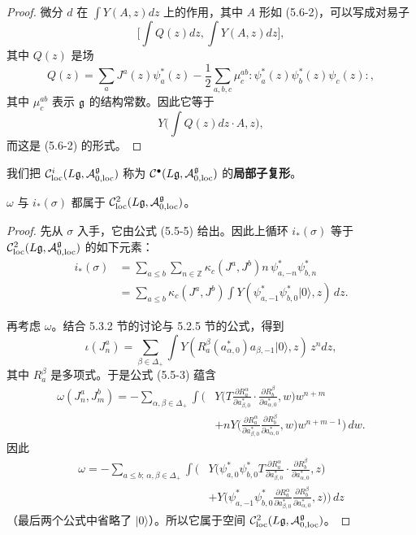 \begin{proof}
微分 $d$ 在 $\int Y(A,z)dz$ 上的作用，其中 $A$ 形如 (5.6-2)，可以写成对易子
\[
\Big[\int Q(z)dz,\int Y(A,z)dz\Big],
\]
其中 $Q(z)$ 是场
\begin{equation}
Q(z) = \sum_a J^a(z)\psi^*_a(z) - \frac{1}{2}\sum_{a,b,c}\mu^{ab}_c{:}\psi^*_a(z)\psi^*_b(z)\psi_c(z){:},
\tag{5.6-3}
\end{equation}
其中 $\mu^{ab}_c$ 表示 $\mathfrak{g}$ 的结构常数。因此它等于
\[
Y\Big(\int Q(z)dz\cdot A,z\Big),
\]
而这是 (5.6-2) 的形式。
\end{proof}

我们把 $\mathcal{C}^i_{\mathrm{loc}}(L\mathfrak{g},\mathcal{A}^{\mathfrak{g}}_{0,\mathrm{loc}})$ 称为 $\mathcal{C}^\bullet(L\mathfrak{g},\mathcal{A}^{\mathfrak{g}}_{0,\mathrm{loc}})$ 的\textbf{局部子复形}。

\begin{lemma}
$\omega$ 与 $i_*(\sigma)$ 都属于 $\mathcal{C}^2_{\mathrm{loc}}(L\mathfrak{g},\mathcal{A}^{\mathfrak{g}}_{0,\mathrm{loc}})$。
\end{lemma}

\begin{proof}
先从 $\sigma$ 入手，它由公式 (5.5-5) 给出。因此上循环 $i_*(\sigma)$ 等于 $\mathcal{C}^2_{\mathrm{loc}}(L\mathfrak{g},\mathcal{A}^{\mathfrak{g}}_{0,\mathrm{loc}})$ 的如下元素：
\begin{equation}
\begin{aligned}
i_*(\sigma) &= \sum_{a\le b}\sum_{n\in\mathbb{Z}}\kappa_c(J^a,J^b)n\,\psi^*_{a,-n}\psi^*_{b,n}\\
&= \sum_{a\le b}\kappa_c(J^a,J^b)\int Y(\psi^*_{a,-1}\psi^*_{b,0}|0\rangle,z)\,dz.
\end{aligned}
\tag{5.6-4}
\end{equation}

再考虑 $\omega$。结合 5.3.2 节的讨论与 5.2.5 节的公式，得到
\[
\iota(J^a_n) = \sum_{\beta\in\Delta_+}\int Y(R^\beta_a(a^*_{\alpha,0})a_{\beta,-1}|0\rangle,z)\,z^n dz,
\]
其中 $R^\beta_a$ 是多项式。于是公式 (5.5-3) 蕴含
\[
\begin{aligned}
\omega(J^a_n,J^b_m) = -\sum_{\alpha,\beta\in\Delta_+}\int\Big(&Y\Big(T\frac{\partial R^\alpha_a}{\partial a^*_{\beta,0}}\cdot\frac{\partial R^\beta_b}{\partial a^*_{\alpha,0}},w\Big)w^{n+m}\\
&+nY\Big(\frac{\partial R^\alpha_a}{\partial a^*_{\beta,0}}\frac{\partial R^\beta_b}{\partial a^*_{\alpha,0}},w\Big)w^{n+m-1}\Big)\,dw.
\end{aligned}
\]
因此
\begin{equation}
\begin{aligned}
\omega = -\sum_{a\le b;\,\alpha,\beta\in\Delta_+}\int\Big(&Y\Big(\psi^*_{a,0}\psi^*_{b,0}T\frac{\partial R^\alpha_a}{\partial a^*_{\beta,0}}\cdot\frac{\partial R^\beta_b}{\partial a^*_{\alpha,0}},z\Big)\\
&+Y\Big(\psi^*_{a,-1}\psi^*_{b,0}\frac{\partial R^\alpha_a}{\partial a^*_{\beta,0}}\frac{\partial R^\beta_b}{\partial a^*_{\alpha,0}},z\Big)\Big)\,dz
\end{aligned}
\tag{5.6-5}
\end{equation}
（最后两个公式中省略了 $|0\rangle$）。所以它属于空间 $\mathcal{C}^2_{\mathrm{loc}}(L\mathfrak{g},\mathcal{A}^{\mathfrak{g}}_{0,\mathrm{loc}})$。
\end{proof}

